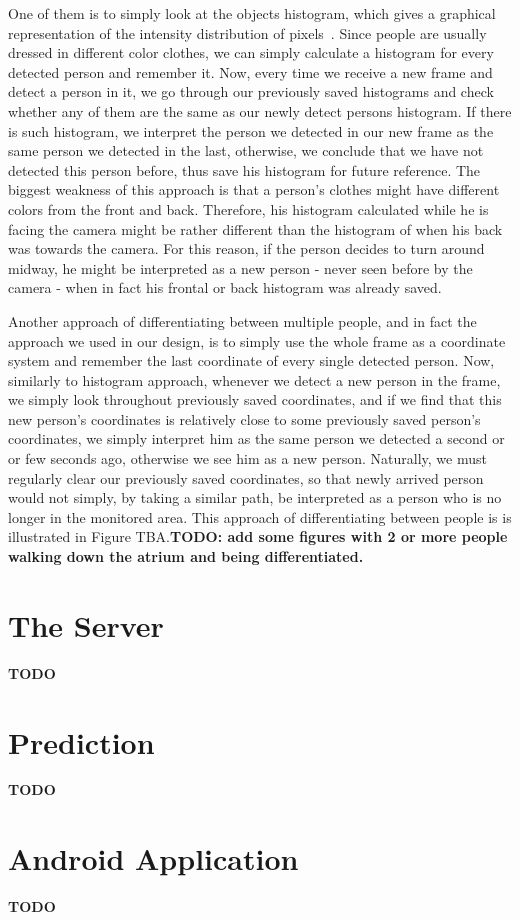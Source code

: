 	One of them is to simply look at the objects histogram, which gives a graphical representation of the intensity distribution of pixels~\cite{histogram_1}. Since people are usually dressed in different color clothes, we can simply calculate a histogram for every detected person and remember it. Now, every time we receive a new frame and detect a person in it, we go through our previously saved histograms and check whether any of them are the same as our newly detect persons histogram. If there is such histogram, we interpret the person we detected in our new frame as the same person we detected in the last, otherwise, we conclude that we have not detected this person before, thus save his histogram for future reference. The biggest weakness of this approach is that a person's clothes might have different colors from the front and back. Therefore, his histogram calculated while he is facing the camera might be rather different than the histogram of when his back was towards the camera. For this reason, if the person decides to turn around midway, he might be interpreted as a new person - never seen before by the camera - when in fact his frontal or back histogram was already saved. 
	
	Another approach of differentiating between multiple people, and in fact the approach we used in our design, is to simply use the whole frame as a coordinate system and remember the last coordinate of every single detected person. Now, similarly to histogram approach, whenever we detect a new person in the frame, we simply look throughout previously saved coordinates, and if we find that this new person's coordinates is relatively close to some previously saved person's coordinates, we simply interpret him as the same person we detected a second or or few seconds ago, otherwise we see him as a new person. Naturally, we must regularly clear our previously saved coordinates, so that newly arrived person would not simply, by taking a similar path, be interpreted as a person who is no longer in the monitored area. This approach of differentiating between people is is illustrated in Figure TBA.{\color[rgb]{1,0,0}\textbf{TODO: add some figures with 2 or more people walking down the atrium and being differentiated.}}

\section{The Server}
{\color[rgb]{1,0,0} \textbf{\large TODO}}

\section{Prediction}
{\color[rgb]{1,0,0} \textbf{\large TODO}}

\section{Android Application}
{\color[rgb]{1,0,0} \textbf{\large TODO}}